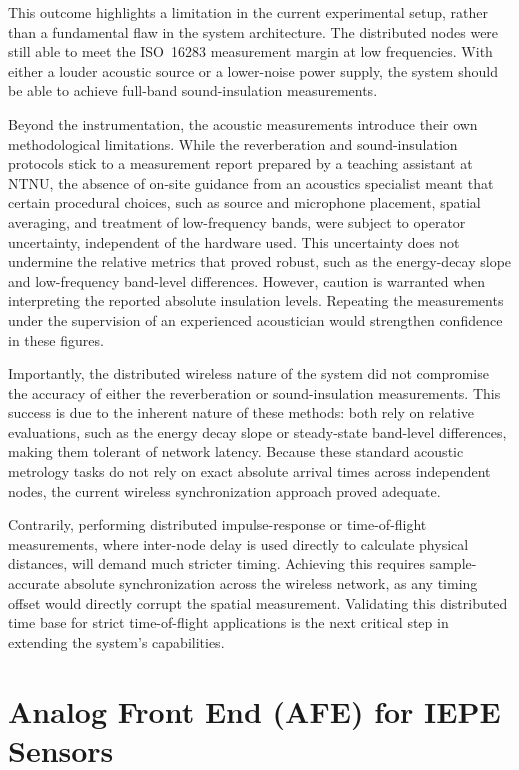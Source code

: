 This outcome highlights a limitation in the current experimental setup, rather than a fundamental flaw in the system architecture. The distributed nodes were still able to meet the ISO~16283 measurement margin at low frequencies. With either a louder acoustic source or a lower-noise power supply, the system should be able to achieve full-band sound-insulation measurements.

Beyond the instrumentation, the acoustic measurements introduce their own methodological limitations. While the reverberation and sound-insulation protocols stick to a measurement report prepared by a teaching assistant at NTNU, the absence of on-site guidance from an acoustics specialist meant that certain procedural choices, such as source and microphone placement, spatial averaging, and treatment of low-frequency bands, were subject to operator uncertainty, independent of the hardware used. This uncertainty does not undermine the relative metrics that proved robust, such as the energy-decay slope and low-frequency band-level differences. However, caution is warranted when interpreting the reported absolute insulation levels. Repeating the measurements under the supervision of an experienced acoustician would strengthen confidence in these figures.

Importantly, the distributed wireless nature of the system did not compromise the accuracy of either the reverberation or sound-insulation measurements. This success is due to the inherent nature of these methods: both rely on relative evaluations, such as the energy decay slope or steady-state band-level differences, making them tolerant of network latency. Because these standard acoustic metrology tasks do not rely on exact absolute arrival times across independent nodes, the current wireless synchronization approach proved adequate.

Contrarily, performing distributed impulse-response or time-of-flight measurements, where inter-node delay is used directly to calculate physical distances, will demand much stricter timing. Achieving this requires sample-accurate absolute synchronization across the wireless network, as any timing offset would directly corrupt the spatial measurement. Validating this distributed time base for strict time-of-flight applications is the next critical step in extending the system's capabilities.
\section{Analog Front End (AFE) for IEPE Sensors}

